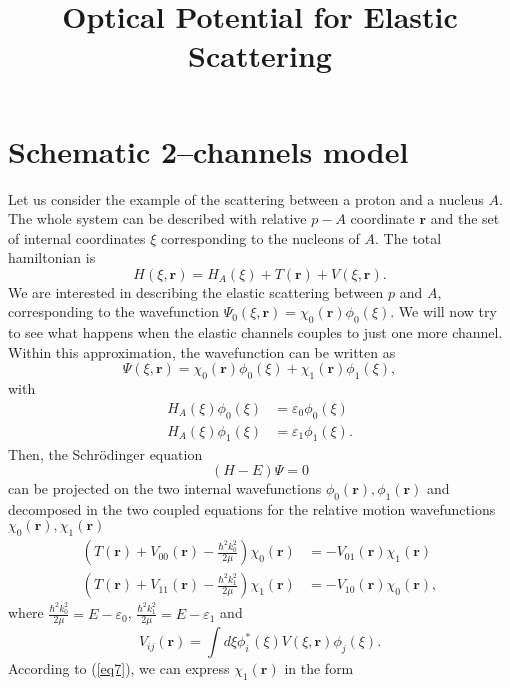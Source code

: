 \documentclass[a4paper,11pt]{article}
\title{Optical Potential for Elastic Scattering}
\begin{document}
\maketitle
\section{Schematic 2--channels model}
Let us  consider the example of the scattering between a proton and a nucleus $A$. The whole system can be described with relative $p-A$ coordinate $\mathbf{r}$ and the set of internal coordinates $\xi$ corresponding to the nucleons of $A$. The total hamiltonian is
\begin{equation}\label{eq1}
H(\xi,\mathbf{r})=H_{A}(\xi)+T(\mathbf{r})+V(\xi,\mathbf{r}).
\end{equation}
We are interested in describing  the elastic scattering between $p$ and $A$, corresponding to the wavefunction $\Psi_0(\xi,\mathbf{r})=\chi_0(\mathbf{r})\phi_0(\xi)$.
We will now try to see what happens when the elastic channels couples to just one more channel. Within this approximation, the wavefunction can be written as
\begin{equation}\label{eq2}
\Psi(\xi,\mathbf{r})=\chi_0(\mathbf{r})\phi_0(\xi)+\chi_1(\mathbf{r})\phi_1(\xi),
\end{equation}
with
\begin{eqnarray}\label{eq3}
\nonumber H_A(\xi)\phi_0(\xi)&=\varepsilon_0\phi_0(\xi)\\
H_A(\xi)\phi_1(\xi)&=\varepsilon_1\phi_1(\xi).
\end{eqnarray}
Then, the Schr\"{o}dinger equation
\begin{equation}\label{eq4}
(H-E)\Psi=0
\end{equation}
can be projected on the two internal wavefunctions $\phi_0(\mathbf{r}),\phi_1(\mathbf{r})$ and decomposed in the two coupled equations for the relative motion wavefunctions $\chi_0(\mathbf{r}),\chi_1(\mathbf{r})$
\begin{eqnarray}\label{eq5}
\nonumber \label{eq12}\left(T(\mathbf{r})+V_{00}(\mathbf{r})-\frac{\hbar^2k_0^2}{2 \mu}\right)\chi_0(\mathbf{r})&=-V_{01}(\mathbf{r})\chi_1(\mathbf{r})\\
\label{eq7} \left(T(\mathbf{r})+V_{11}(\mathbf{r})-\frac{\hbar^2k_1^2}{2 \mu}\right)\chi_1(\mathbf{r})&=-V_{10}(\mathbf{r})\chi_0(\mathbf{r}),
\end{eqnarray}
where $\tfrac{\hbar^2k_0^2}{2 \mu}=E-\varepsilon_0$, $\tfrac{\hbar^2k_1^2}{2 \mu}=E-\varepsilon_1$ and
\begin{equation}\label{eq6}
V_{ij}(\mathbf{r})=\int d\xi \phi^*_i(\xi)V(\xi,\mathbf{r})\phi_j(\xi).
\end{equation}
According to (\ref{eq7}), we can express $\chi_1(\mathbf{r})$ in the form
\end{document}
